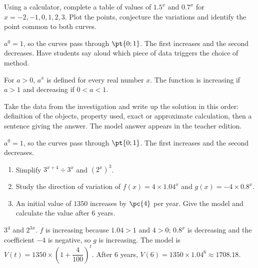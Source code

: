 \begin{activity}
Using a calculator, complete a table of values of $\num{1,5}^x$ and $\num{0,7}^x$ for $x=-2,-1,0,1,2,3$. Plot the points, conjecture the variations and identify the point common to both curves.
\begin{center}\end{center}
\end{activity}
\begin{solution}$a^0=1$, so the curves pass through $\pt{0;1}$. The first increases and the second decreases. Have students say aloud which piece of data triggers the choice of method.\end{solution}

\begin{summary}For $a>0$, $a^x$ is defined for every real number $x$. The function is increasing if $a>1$ and decreasing if $0<a<1$.\end{summary}

\begin{example}
Take the data from the investigation and write up the solution in this order: definition of the objects, property used, exact or approximate calculation, then a sentence giving the answer. The model answer appears in the teacher edition.
\end{example}
\begin{solution}$a^0=1$, so the curves pass through $\pt{0;1}$. The first increases and the second decreases.\end{solution}

\begin{exercise}[essential]
\begin{enumerate}\item Simplify $3^{x+4}\div3^x$ and $(2^x)^3$.\item Study the direction of variation of $f(x)=4\times\num{1,04}^x$ and $g(x)=-4\times\num{0,8}^x$.\item An initial value of $1350$ increases by $\pc{4}$ per year. Give the model and calculate the value after $6$ years.\end{enumerate}
\end{exercise}
\begin{solution}$3^4$ and $2^{3x}$. $f$ is increasing because $\num{1,04}>1$ and $4>0$; $\num{0,8}^x$ is decreasing and the coefficient $-4$ is negative, so $g$ is increasing. The model is $V(t)=1350\times\left(1+\dfrac{4}{100}\right)^t$. After $6$ years, $V(6)=1350\times\num{1,04}^6\approx\num{1708,18}$.\end{solution}

